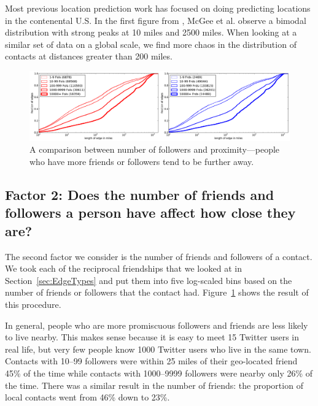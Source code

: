 \documentclass[letterpaper]{article}
\begin{document}
Most previous location prediction work has focused on doing predicting
locations in the contenental U.S.
%
In the first figure from \cite{mcgee2011geographic}, McGee et al. observe a
bimodal distribution with strong peaks at 10 miles and 2500 miles.
%
When looking at a similar set of data on a global scale, we find more chaos in
the distribution of contacts at distances greater than 200 miles.

\begin{figure}[tbh]
\centering
\includegraphics[width=\linewidth]{figures/edge_counts.pdf}
\caption{
A comparison between number of followers and proximity---people who have more
friends or followers tend to be further away.
}
\label{fig:EdgeCounts}
\end{figure}

\subsection{Factor 2: Does the number of friends and followers a person have affect how
close they are?}

%
The second factor we consider is the number of friends and followers of a contact. %
%
We took each of the reciprocal friendships that we looked at in
Section~\ref{sec:EdgeTypes} and put them into five log-scaled bins based on
the number of friends or followers that the contact had.
%
Figure~\ref{fig:EdgeCounts} shows the result of this procedure.

In general, people who are more promiscuous followers and friends are less
likely to live nearby.
%
This makes sense because it is easy to meet 15 Twitter users in real life, but
very few people know 1000 Twitter users who live in the same town.
%
Contacts with 10--99 followers were within 25 miles of their geo-located friend
45\% of the time while contacts with 1000--9999 followers were nearby only 26\%
of the time.
%
There was a similar result in the number of friends: the proportion of local
contacts went from 46\% down to 23\%.
\end{document}
